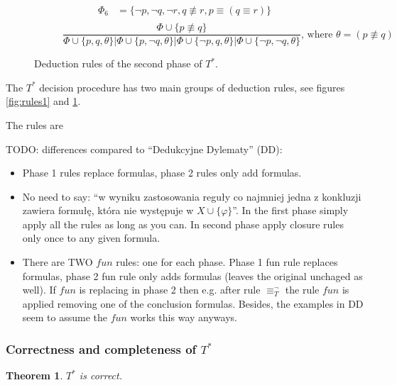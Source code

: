 \documentclass{article}
\newtheorem{theorem}{Theorem}
\theoremstyle{definition}
\newcommand*{\Ts}{T^*}
\newcommand*{\eq}{\equiv}
\begin{document}
\begin{figure}
\begin{subfigure}{\textwidth}
\[\begin{aligned}
                \Phi_6 & = \{\lnot p, \lnot q,\lnot r, q \not \eq r, p \eq (q \eq r) \} \\
            \end{aligned}
        \]
        \begin{equation}
            \tag{$\eq_\bot$}
            \frac{
                \Phi \cup \{ p \not \eq q \} }%
            { \Phi \cup \{p,q,\theta\} |
                \Phi \cup \{p,\lnot q,\theta\} |
                \Phi \cup \{\lnot p,q,\theta\} |
                \Phi \cup \{\lnot p,\lnot q,\theta\}
            }
            \text{, where } \theta = (p \not \eq q)
        \end{equation}
    \end{subfigure}
    \caption{Deduction rules of the second phase of $\Ts$.}
    \label{fig:rules2}
\end{figure}

The $\Ts$ decision procedure has two main groups of deduction rules, see figures \ref{fig:rules1} and \ref{fig:rules2}.

The rules are

TODO: differences compared to \enquote{Dedukcyjne Dylematy} (DD):
\begin{itemize}
    \item Phase 1 rules replace formulas, phase 2 rules only add formulas.
    \item No need to say: \enquote{w wyniku zastosowania reguły co najmniej jedna z konkluzji zawiera formułę, która nie występuje w $X \cup \{\varphi\}$}. In the first phase simply apply all the rules as long as you can. In second phase apply closure rules only once to any given formula.
    \item There are TWO $fun$ rules: one for each phase. Phase 1 fun rule replaces formulas, phase 2 fun rule only adds formulas (leaves the original unchaged as well). If $fun$ is replacing in phase 2 then e.g. after rule $\equiv_T^\lnot$ the rule $fun$ is applied removing one of the conclusion formulas. Besides, the examples in DD seem to assume the $fun$ works this way anyways.
\end{itemize}

\subsubsection{Correctness and completeness of $\Ts$}
\begin{theorem}
    $\Ts$ is correct.
\end{theorem}
\end{document}
